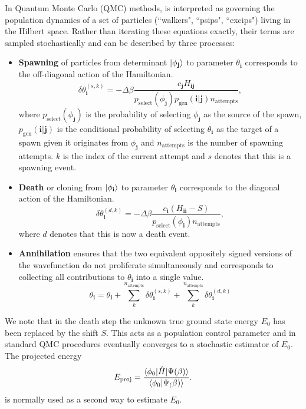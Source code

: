 \documentclass[%
 reprint,
 amsmath,amssymb,
 aps,
]{revtex4-2}
\begin{document}
In Quantum Monte Carlo (QMC) methods,  is interpreted as governing the population dynamics of a set of particles (``walkers", ``psips", ``excips") living in the Hilbert space. Rather than iterating these equations exactly, their terms are sampled stochastically and can be described by three processes:\cite{Booth2009}
\begin{itemize}
\item \textbf{Spawning} of particles from determinant $\ket{\phi_\mathbf{j}}$ to parameter $\theta_\mathbf{i}$ corresponds to the off-diagonal action of the Hamiltonian.
\begin{equation} 
\delta \theta_\mathbf{i}^{(s, k)} = - \Delta\beta \frac{c_\mathbf{j}H_\mathbf{ij}}{p_\mathrm{select}(\phi_\mathbf{j}) p_\mathrm{gen}(\mathbf{i}|\mathbf{j}) n_\mathrm{attempts}},
\label{eq:pspawn}
\end{equation}
where $p_\mathrm{select}(\phi_\mathbf{j})$ is the probability of selecting $\phi_\mathbf{j}$ as the source of the spawn, $p_\mathrm{gen}(\mathbf{i}|\mathbf{j})$ is the conditional probability of selecting $\theta_\mathbf{i}$ as the target of a spawn given it originates from $\phi_\mathbf{j}$ and $n_\mathrm{attempts}$ is the number of spawning attempts. $k$ is the index of the current attempt and $s$ denotes that this is a spawning event.
\item \textbf{Death} or cloning from $\ket{\phi_\mathbf{i}}$ to parameter $\theta_\mathbf{i}$ corresponds to the diagonal action of the Hamiltonian.
\begin{equation} 
\delta \theta_\mathbf{i}^{(d, k)} = - \Delta\beta \frac{c_\mathbf{i} (H_\mathbf{ii} - S)}{p_\mathrm{select}(\phi_\mathbf{i}) n_\mathrm{attempts}},
\end{equation}
where $d$ denotes that this is now a death event.
\item \textbf{Annihilation} ensures that the two equivalent oppositely signed versions of the wavefunction do not proliferate simultaneously and corresponds to collecting all contributions to $\theta_\mathbf{i}$ into a single value.
\begin{equation}
\theta_\mathbf{i} = \theta_\mathbf{i} + \sum_k^{n_\mathrm{attempts}}\delta \theta_\mathbf{i}^{(s, k)} + \sum_k^{n_\mathrm{attempts}}\delta \theta_\mathbf{i}^{(d, k)}
\end{equation}
\end{itemize}
We note that in the death step the unknown true ground state energy $E_0$ has been replaced by the shift $S$. This acts as a population control parameter and in standard QMC procedures eventually converges to a stochastic estimator of $E_0$.\cite{Booth2009} The projected energy
\begin{equation}
    E_\mathrm{proj} = \frac{\braket{\phi_0|\hat H| \Psi(\beta)}}{\braket{\phi_0|\Psi_(\beta)}}.
    \label{eq:e_proj}
\end{equation}
is normally used as a second way to estimate $E_0$.
\end{document}
